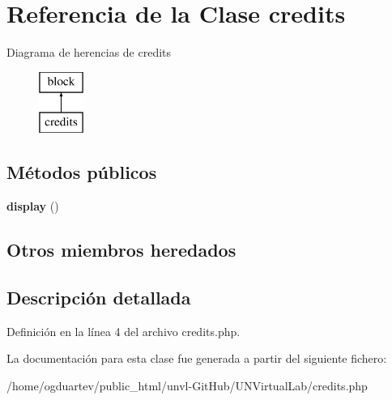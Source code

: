 \hypertarget{classcredits}{}\section{Referencia de la Clase credits}
\label{classcredits}
Diagrama de herencias de credits\begin{figure}[H]
\begin{center}
\leavevmode
\includegraphics[height=2.000000cm]{classcredits}
\end{center}
\end{figure}
\subsection*{Métodos públicos}
\begin{DoxyCompactItemize}
\item 
\mbox{\label{classcredits_aed4f2bfc57e15cd9e2749ff7411a9be6}} 
{\bfseries display} ()
\end{DoxyCompactItemize}
\subsection*{Otros miembros heredados}


\subsection{Descripción detallada}


Definición en la línea 4 del archivo credits.\+php.



La documentación para esta clase fue generada a partir del siguiente fichero\+:\begin{DoxyCompactItemize}
\item 
/home/ogduartev/public\+\_\+html/unvl-\/\+Git\+Hub/\+U\+N\+Virtual\+Lab/credits.\+php\end{DoxyCompactItemize}

